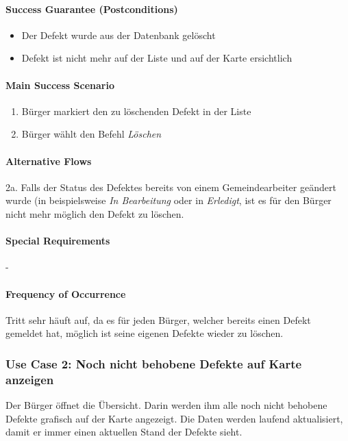 \paragraph{Success Guarantee (Postconditions)}
\begin{itemize}
\item Der Defekt wurde aus der Datenbank gelöscht
\item Defekt ist nicht mehr auf der Liste und auf der Karte ersichtlich
\end{itemize}

\paragraph{Main Success Scenario}
\begin{enumerate}
\item Bürger markiert den zu löschenden Defekt in der Liste
\item Bürger wählt den Befehl \emph{Löschen}
\end{enumerate}

\paragraph{Alternative Flows}
2a. Falls der Status des Defektes bereits von einem Gemeindearbeiter geändert wurde (in beispielsweise \emph{In Bearbeitung} oder in \emph{Erledigt}, ist es für den Bürger nicht mehr möglich den Defekt zu löschen.

\paragraph{Special Requirements}
-

\paragraph{Frequency of Occurrence}
Tritt sehr häuft auf, da es für jeden Bürger, welcher bereits einen Defekt gemeldet hat, möglich ist seine eigenen Defekte wieder zu löschen.

\subsubsection{Use Case 2: Noch nicht behobene Defekte auf Karte anzeigen}
Der Bürger öffnet die Übersicht. Darin werden ihm alle noch nicht behobene Defekte grafisch auf der Karte angezeigt. Die Daten werden laufend aktualisiert, damit er immer einen aktuellen Stand der Defekte sieht.

